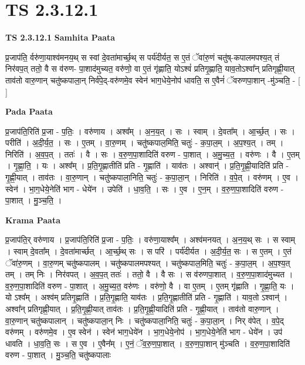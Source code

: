 \documentclass[17pt]{extarticle}
\begin{document}
\section*{ TS 2.3.12.1 }

\textbf{TS 2.3.12.1 } \newline
\textbf{Samhita Paata} \newline

प्र॒जाप॑ति॒ र्वरु॑णा॒याश्व॑मनय॒थ् स स्वां दे॒वता॑मार्च्छ॒थ् स पर्य॑दीर्यत॒ स ए॒तं ॅवा॑रु॒णं चतु॑ष्-कपालमपश्य॒त् तं निर॑वप॒त् ततो॒ वै स व॑रुण- पा॒शाद॑मुच्यत॒ वरु॑णो॒ वा ए॒तं गृ॑ह्णाति॒ योऽश्वं॑ प्रतिगृ॒ह्णाति॒ याव॒तोऽश्वा᳚न् प्रतिगृह्णी॒यात् ताव॑तो वारु॒णान् चतु॑ष्कपाला॒न् निर्व॑पे॒द्-वरु॑णमे॒व स्वेन॑ भाग॒धेये॒नोप॑ धावति॒ स ए॒वैनं॑ ॅवरुणपा॒शान् -मु॑ञ्चति॒ - [  ] \newline

\textbf{Pada Paata} \newline

प्र॒जाप॑ति॒रिति॑ प्र॒जा - प॒तिः॒ । वरु॑णाय । अश्व᳚म् । अ॒न॒य॒त् । सः । स्वाम् । दे॒वता᳚म् । आ॒र्च्छ॒त् । सः । परीति॑ । अ॒दी॒र्य॒त॒ । सः । ए॒तम् । वा॒रु॒णम् । चतु॑ष्कपाल॒मिति॒ चतुः॑ - क॒पा॒ल॒म् । अ॒प॒श्य॒त् । तम् । निरिति॑ । अ॒व॒प॒त् । ततः॑ । वै । सः । व॒रु॒ण॒पा॒शादिति॑ वरुण - पा॒शात् । अ॒मु॒च्य॒त॒ । वरु॑णः । वै । ए॒तम् । गृ॒ह्णा॒ति॒ । यः । अश्व᳚म् । प्र॒ति॒गृ॒ह्णातीति॑ प्रति - गृ॒ह्णाति॑ । याव॑तः । अश्वान्॑ । प्र॒ति॒गृ॒ह्णी॒यादिति॑ प्रति - गृ॒ह्णी॒यात् । ताव॑तः । वा॒रु॒णान् । चतु॑ष्कपाला॒निति॒ चतुः॑ - क॒पा॒ला॒न् । निरिति॑ । व॒पे॒त् । वरु॑णम् । ए॒व । स्वेन॑ । भा॒ग॒धेये॒नेति॑ भाग - धेये॑न । उपेति॑ । धा॒व॒ति॒ । सः । ए॒व । ए॒न॒म् । व॒रु॒ण॒पा॒शादिति॑ वरुण - पा॒शात् । मु॒ञ्च॒ति॒ ।  \newline


\textbf{Krama Paata} \newline

प्र॒जाप॑ति॒र् वरु॑णाय । प्र॒जाप॑ति॒रिति॑ प्र॒जा - प॒तिः॒ । वरु॑णा॒याश्व᳚म् । अश्व॑मनयत् । अ॒न॒य॒थ् सः । स स्वाम् । स्वाम् दे॒वता᳚म् । दे॒वता॑मार्च्छत् । आ॒र्च्छ॒थ् सः । स परि॑ । पर्य॑दीर्यत । अ॒दी॒र्य॒त॒ सः । स ए॒तम् । ए॒तं ॅवा॑रु॒णम् । वा॒रु॒णम् चतु॑ष्कपालम् । चतु॑ष्कपालमपश्यत् । चतु॑ष्कपाल॒मिति॒ चतुः॑ - क॒पा॒ल॒म् । अ॒प॒श्य॒त् तम् । तम् निः । निर॑वपत् । अ॒व॒प॒त् ततः॑ । ततो॒ वै । वै सः । स व॑रुणपा॒शात् । व॒रु॒ण॒पा॒शाद॑मुच्यत । व॒रु॒ण॒पा॒शादिति॑ वरुण - पा॒शात् । अ॒मु॒च्य॒त॒ वरु॑णः । वरु॑णो॒ वै । वा ए॒तम् । ए॒तम् गृ॑ह्णाति । गृ॒ह्णा॒ति॒ यः । यो ऽश्व᳚म् । अश्व॑म् प्रतिगृ॒ह्णाति॑ । प्र॒ति॒गृ॒ह्णाति॒ याव॑तः । प्र॒ति॒गृ॒ह्णातीति॑ प्रति - गृ॒ह्णाति॑ । याव॒तो ऽश्वान्॑ । अश्वा᳚न् प्रतिगृह्णी॒यात् । प्र॒ति॒गृ॒ह्णी॒यात् ताव॑तः । प्र॒ति॒गृ॒ह्णी॒यादिति॑ प्रति - गृ॒ह्णी॒यात् । ताव॑तो वारु॒णान् । वा॒रु॒णान् चतु॑ष्कपालान् । चतु॑ष्कपाला॒न् निः । चतु॑ष्कपाला॒निति॒ चतुः॑ - क॒पा॒ला॒न् । निर् व॑पेत् । व॒पे॒द् वरु॑णम् । वरु॑णमे॒व । ए॒व स्वेन॑ । स्वेन॑ भाग॒धेये॑न । भा॒ग॒धेये॒नोप॑ । भा॒ग॒धेये॒नेति॑ भाग - धेये॑न । उप॑ धावति । धा॒व॒ति॒ सः । स ए॒व । ए॒वैन᳚म् । ए॒नं॒ ॅव॒रु॒ण॒पा॒शात् । व॒रु॒ण॒पा॒शान् मु॑ञ्चति । व॒रु॒ण॒पा॒शादिति॑ वरुण - पा॒शात् । मु॒ञ्च॒ति॒ चतु॑ष्कपालाः \newline
\end{document}
